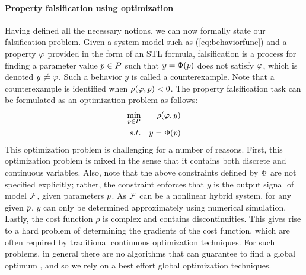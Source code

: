 



\paragraph{Property falsification using optimization}	
Having defined all the necessary notions, we can now formally state our falsification problem.
Given a system model such as (\ref{eq:behaviorfunc}) and a property $\varphi$ provided in the form of an STL formula, 
falsification is a process for finding a parameter value $p \in P$
such that $y=\Phi(p)$ does not satisfy $\varphi$, which is denoted $y
\not\models \varphi$. Such a behavior $y$ is called a counterexample. 
Note that a counterexample is identified when 
$\rho(\varphi,p)<0$. The property falsification task can be formulated as an optimization problem as follows:
\begin{eqnarray} \label{eq:optim1}
\min_{p \in P} && \rho(\varphi,y) \\ \nonumber
s.t. && y=\Phi(p)
\end{eqnarray}
This optimization problem is challenging for a number of reasons. First, this optimization problem is mixed in the sense that it contains both discrete and continuous variables. Also, note that the above constraints defined by $\Phi$ 
are not specified explicitly; rather, the constraint enforces that $y$ is the output signal of model $\mathcal{F}$, given parameters $p$.
As $\mathcal{F}$ can be a nonlinear hybrid system, for any given $p$, $y$ can only be determined approximately using numerical simulation. 
Lastly, the cost function $\rho$ is complex and contains discontinuities.
This gives rise to a hard problem of determining the gradients of the cost function, which are often required by traditional continuous optimization techniques. 
For such problems, in general there are no algorithms that can guarantee to find a global optimum \cite{FloudasPardalos2009}, and so we rely on a best effort global optimization techniques. 

